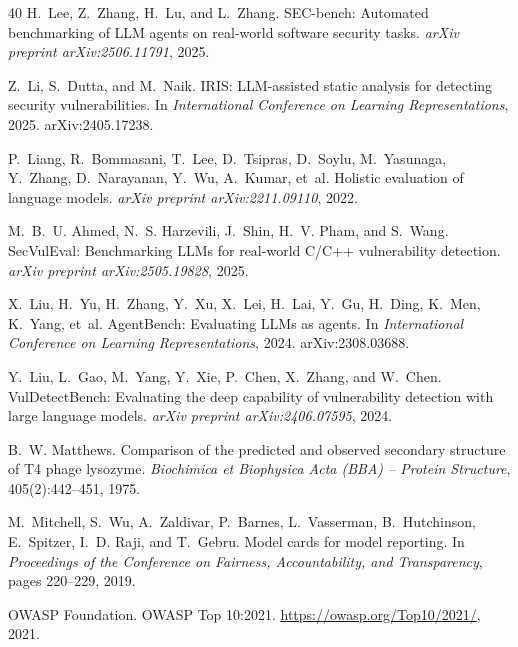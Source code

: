 \documentclass[10pt,twocolumn]{article}
\begin{document}
\begin{thebibliography}{40}
H.~Lee, Z.~Zhang, H.~Lu, and L.~Zhang.
\newblock SEC-bench: Automated benchmarking of LLM agents on real-world software security tasks.
\newblock \emph{arXiv preprint arXiv:2506.11791}, 2025.

Z.~Li, S.~Dutta, and M.~Naik.
\newblock IRIS: LLM-assisted static analysis for detecting security vulnerabilities.
\newblock In \emph{International Conference on Learning Representations}, 2025. arXiv:2405.17238.

P.~Liang, R.~Bommasani, T.~Lee, D.~Tsipras, D.~Soylu, M.~Yasunaga, Y.~Zhang, D.~Narayanan, Y.~Wu, A.~Kumar, et~al.
\newblock Holistic evaluation of language models.
\newblock \emph{arXiv preprint arXiv:2211.09110}, 2022.

M.~B.~U. Ahmed, N.~S. Harzevili, J.~Shin, H.~V. Pham, and S.~Wang.
\newblock SecVulEval: Benchmarking LLMs for real-world {C/C++} vulnerability detection.
\newblock \emph{arXiv preprint arXiv:2505.19828}, 2025.

X.~Liu, H.~Yu, H.~Zhang, Y.~Xu, X.~Lei, H.~Lai, Y.~Gu, H.~Ding, K.~Men, K.~Yang, et~al.
\newblock AgentBench: Evaluating LLMs as agents.
\newblock In \emph{International Conference on Learning Representations}, 2024. arXiv:2308.03688.

Y.~Liu, L.~Gao, M.~Yang, Y.~Xie, P.~Chen, X.~Zhang, and W.~Chen.
\newblock VulDetectBench: Evaluating the deep capability of vulnerability detection with large language models.
\newblock \emph{arXiv preprint arXiv:2406.07595}, 2024.

B.~W. Matthews.
\newblock Comparison of the predicted and observed secondary structure of T4 phage lysozyme.
\newblock \emph{Biochimica et Biophysica Acta (BBA) -- Protein Structure}, 405(2):442--451, 1975.

M.~Mitchell, S.~Wu, A.~Zaldivar, P.~Barnes, L.~Vasserman, B.~Hutchinson, E.~Spitzer, I.~D. Raji, and T.~Gebru.
\newblock Model cards for model reporting.
\newblock In \emph{Proceedings of the Conference on Fairness, Accountability, and Transparency}, pages 220--229, 2019.

{OWASP Foundation}.
\newblock OWASP Top 10:2021.
\newblock \url{https://owasp.org/Top10/2021/}, 2021.


\end{thebibliography}
\end{document}
